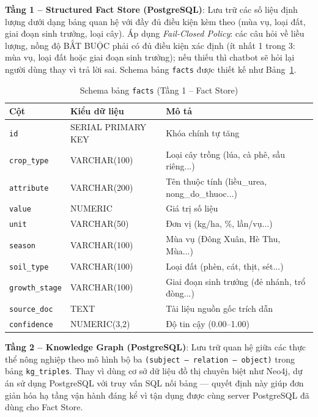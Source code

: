 \textbf{Tầng 1 -- Structured Fact Store (PostgreSQL)}: Lưu trữ các số liệu định lượng dưới dạng bảng quan hệ với đầy đủ điều kiện kèm theo (mùa vụ, loại đất, giai đoạn sinh trưởng, loại cây). Áp dụng \textit{Fail-Closed Policy}: các câu hỏi về liều lượng, nồng độ BẮT BUỘC phải có đủ điều kiện xác định (ít nhất 1 trong 3: mùa vụ, loại đất hoặc giai đoạn sinh trưởng); nếu thiếu thì chatbot sẽ hỏi lại người dùng thay vì trả lời sai. Schema bảng \texttt{facts} được thiết kế như Bảng~\ref{tab:schema-facts}.

\begin{table}[H]
\caption{Schema bảng \texttt{facts} (Tầng 1 -- Fact Store)}
\label{tab:schema-facts}
\centering
\begin{tabular}{|p{3.5cm}|p{2.5cm}|p{7.5cm}|}
\hline
\textbf{Cột} & \textbf{Kiểu dữ liệu} & \textbf{Mô tả} \\
\hline
\texttt{id} & SERIAL PRIMARY KEY & Khóa chính tự tăng \\
\hline
\texttt{crop\_type} & VARCHAR(100) & Loại cây trồng (lúa, cà phê, sầu riêng...) \\
\hline
\texttt{attribute} & VARCHAR(200) & Tên thuộc tính (liều\_urea, nong\_do\_thuoc...) \\
\hline
\texttt{value} & NUMERIC & Giá trị số liệu \\
\hline
\texttt{unit} & VARCHAR(50) & Đơn vị (kg/ha, \%, lần/vụ...) \\
\hline
\texttt{season} & VARCHAR(100) & Mùa vụ (Đông Xuân, Hè Thu, Mùa...) \\
\hline
\texttt{soil\_type} & VARCHAR(100) & Loại đất (phèn, cát, thịt, sét...) \\
\hline
\texttt{growth\_stage} & VARCHAR(100) & Giai đoạn sinh trưởng (đẻ nhánh, trổ đòng...) \\
\hline
\texttt{source\_doc} & TEXT & Tài liệu nguồn gốc trích dẫn \\
\hline
\texttt{confidence} & NUMERIC(3,2) & Độ tin cậy (0.00--1.00) \\
\hline
\end{tabular}
\end{table}

\textbf{Tầng 2 -- Knowledge Graph (PostgreSQL)}: Lưu trữ quan hệ giữa các thực thể nông nghiệp theo mô hình bộ ba \texttt{(subject -- relation -- object)} trong bảng \texttt{kg\_triples}. Thay vì dùng cơ sở dữ liệu đồ thị chuyên biệt như Neo4j, dự án sử dụng PostgreSQL với truy vấn SQL nối bảng --- quyết định này giúp đơn giản hóa hạ tầng vận hành đáng kể vì tận dụng được cùng server PostgreSQL đã dùng cho Fact Store.

